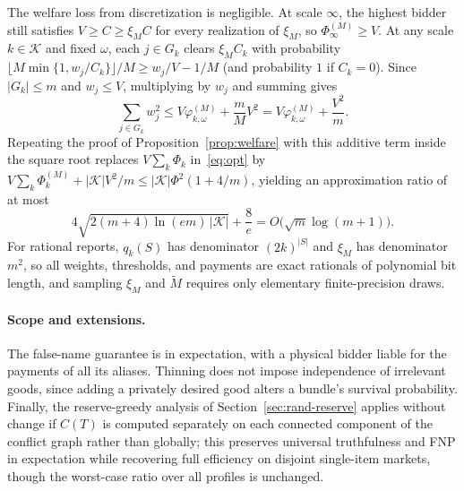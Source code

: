 \documentclass[format=acmsmall, review=false]{acmart}
\theoremstyle{acmdefinition}%
\begin{document}
The welfare loss from discretization is negligible. At scale
\(\infty\), the highest bidder still satisfies \(V\ge C\ge\xi_M C\)
for every realization of \(\xi_M\), so \(\Phi_\infty^{(M)}\ge V\).
At any scale \(k\in\mathcal K\) and fixed \(\omega\), each
\(j\in G_k\) clears \(\xi_M C_k\) with probability
\(\lfloor M\min\{1,w_j/C_k\}\rfloor/M\ge w_j/V-1/M\) (and
probability \(1\) if \(C_k=0\)). Since \(|G_k|\le m\) and
\(w_j\le V\), multiplying by \(w_j\) and summing gives
\[
\sum_{j\in G_k}w_j^2
\le V\varphi_{k,\omega}^{(M)}+\frac{m}{M}V^2
=V\varphi_{k,\omega}^{(M)}+\frac{V^2}{m}.
\]
Repeating the proof of Proposition~\ref{prop:welfare} with this
additive term inside the square root replaces
\(V\sum_k\Phi_k\) in~\eqref{eq:opt} by
\(V\sum_k\Phi_k^{(M)}+|\mathcal K|V^2/m\le|\mathcal K|\Phi^2(1+4/m)\),
yielding an approximation ratio of at most
\[
4\sqrt{2(m+4)\ln(em)\,|\mathcal K|}+\frac8e
=O\bigl(\sqrt m\log(m+1)\bigr).
\]
For rational reports, \(q_k(S)\) has denominator \((2k)^{|S|}\)
and \(\xi_M\) has denominator \(m^2\), so all weights,
thresholds, and payments are exact rationals of polynomial bit
length, and sampling \(\xi_M\) and \(\widetilde M\) requires only
elementary finite-precision draws.

\paragraph{Scope and extensions.}
The false-name guarantee is in expectation, with a physical bidder
liable for the payments of all its aliases. Thinning does not
impose independence of irrelevant goods, since adding a privately
desired good alters a bundle's survival probability. Finally, the
reserve-greedy analysis of Section~\ref{sec:rand-reserve} applies
without change if \(C(T)\) is computed separately on each
connected component of the conflict graph rather than globally;
this preserves universal truthfulness and FNP in expectation while
recovering full efficiency on disjoint single-item markets, though
the worst-case ratio over all profiles is unchanged.



\end{document}
